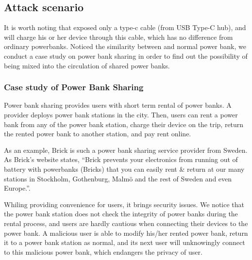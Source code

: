 \subsection{Attack scenario}

It is worth noting that \tool exposed only a type-c cable (from USB Type-C hub),
and \tool will charge his or her device through this cable, which has no difference from ordinary powerbanks. Noticed the similarity between \tool and normal power bank, we conduct a case study on power bank sharing in order to find out the possibility of \tool being mixed into the circulation of shared power banks.

\subsubsection{Case study of Power Bank Sharing}

Power bank sharing provides users with short term rental of power banks. A provider deploys power bank stations in the city. Then, users can rent a power bank from any of the power bank station, charge their device on the trip, return the rented power bank to another station, and pay rent online.

As an example, Brick is such a power bank sharing service provider from Sweden. As Brick's website states, ``Brick prevents your electronics from running out of battery with powerbanks (Bricks) that you can easily rent \& return at our many stations in Stockholm, Gothenburg, Malmö and the rest of Sweden and even Europe.''. 



Whiling providing convenience for users, it brings security issues. We notice that the power bank station does not check the integrity of power banks during the rental process, and users are hardly cautious when connecting their devices to the power bank. A malicious user is able to modify his/her rented power bank, return it to a power bank station as normal, and its next user will unknowingly connect to this malicious power bank, which endangers the privacy of user.
